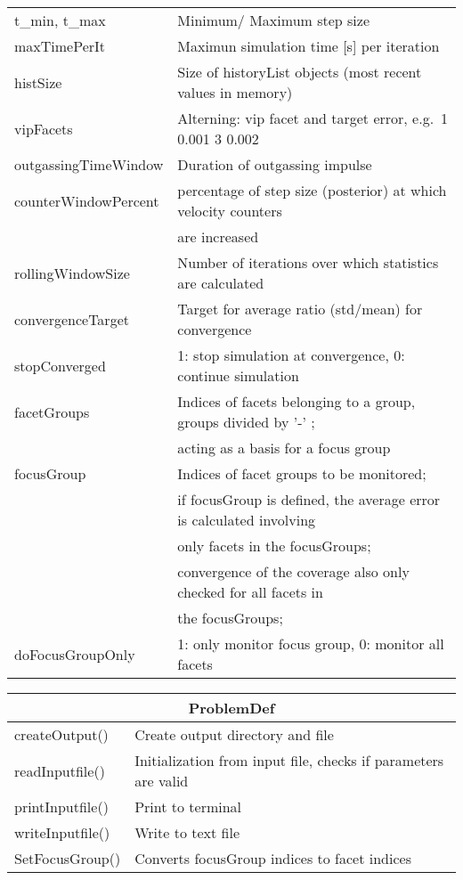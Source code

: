 \begin{center}
\begin{tabular}{|l|l|}
\rule{0pt}{3ex}  t\_min, t\_max&  Minimum/ Maximum step size\\
\rule{0pt}{3ex}  maxTimePerIt&  Maximun simulation time [s] per iteration\\
\rule{0pt}{3ex}  histSize&  Size of historyList objects (most recent values in memory)\\
\rule{0pt}{3ex}  vipFacets&  Alterning: vip facet and target error, e.g.\ 1 0.001 3 0.002\\
\rule{0pt}{3ex}  outgassingTimeWindow&  Duration of outgassing impulse\\
\rule{0pt}{3ex}  counterWindowPercent&  percentage of step size (posterior) at which velocity counters \\ & are increased\\
\rule{0pt}{3ex}  rollingWindowSize&  Number of iterations over which statistics are calculated\\
\rule{0pt}{3ex}  convergenceTarget&  Target for average ratio (std/mean) for convergence\\
\rule{0pt}{3ex}  stopConverged&  1: stop simulation at convergence, 0: continue simulation\\
\rule{0pt}{3ex}  facetGroups&  Indices of facets belonging to a group, groups divided by '-' ;\\ & acting as a basis for a focus group\\
\rule{0pt}{3ex}  focusGroup& Indices of facet groups to be monitored;\\
& if focusGroup is defined, the average error is calculated involving\\
& only facets in the focusGroups;\\
& convergence of the coverage also only checked for all facets in\\& the focusGroups;\\
\rule{0pt}{3ex} doFocusGroupOnly& 1: only monitor focus group, 0: monitor all facets\\
\hline
\end{tabular}
\end{center}
\begin{center}
	\begin{tabular}{|l|l|}
		\hline
		\multicolumn{2}{|c|}{\rule{0pt}{3ex}ProblemDef}\\
		\hline
		\rule{0pt}{3ex} createOutput()& Create output directory and file\\
		\rule{0pt}{3ex} readInputfile()& Initialization from input file, checks if parameters are valid\\
		\rule{0pt}{3ex} printInputfile()& Print to terminal\\
		\rule{0pt}{3ex} writeInputfile()& Write to text file\\
		\rule{0pt}{3ex} SetFocusGroup()& Converts focusGroup indices to facet indices\\
		\hline
	\end{tabular}
\end{center}


